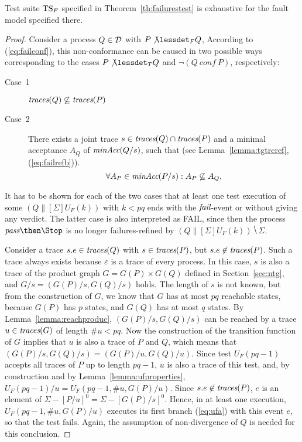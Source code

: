 %
\begin{lemma}\label{lemma:mainfexhaustive}
Test suite ${\text{TS}}_F$ specified in Theorem~\ref{th:failurestest} is exhaustive
for the fault model specified there.
\end{lemma}
\begin{proof}
Consider a process $Q\in{\cal D}$ with $P\not\lessdet_F Q$, According to
(\ref{eq:failconf}), this non-conformance can be caused in two possible ways
corresponding to the cases $P\not\lessdet_T Q$ and $\neg(Q\ conf\ P)$,
respectively:
\begin{description}
\item[Case~1] $\text{\it traces}(Q)\not\subseteq \text{\it traces}(P)$
\item[Case~2] There exists a joint trace $s\in\text{\it traces}(Q)\cap\text{\it traces}(P)$ and a minimal acceptance $A_Q$
of $\text{\it minAcc}(Q/s)$, such that
(see Lemma~\ref{lemma:tgtrcref}, (\ref{eq:failrefb})).
\begin{equation}
\label{eq:accsnotcontained}
\forall A_P\in\text{\it minAcc}(P/s): A_P\not\subseteq A_Q,
\end{equation}
\end{description}
It has to be shown for each of the two cases that at least one test
execution of some $(Q\parallel[\Sigma] U_F(k))$ with $k < pq$ ends with the
   ${\text{\it fail}}$-event or without giving any verdict. The latter case is also
interpreted  as FAIL, since then the process $\epass\then\Stop$ is no longer
failures-refined by $(Q\parallel[\Sigma] U_F(k))\hide \Sigma$.

\medskip
{} Consider a  trace $s.e\in\text{\it traces}(Q)$ with $s\in\text{\it traces}(P)$,
but $s.e\not\in\text{\it traces}(P)$. Such a trace always exists because $\varepsilon$ is
a trace of every process. In this case, $s$ is also a trace of the product
graph $G = G(P)\times G(Q)$ defined in Section~\ref{sec:ntg}, and $G/s =
(G(P)/s,G(Q)/s)$ holds. The length of $s$ is not known, but from the
construction of $G$,  we know that $G$ has at most $pq$ reachable states,
because $G(P)$ has $p$ states, and $G(Q)$ has at most $q$ states. By
Lemma~\ref{lemma:reachproduc}, $(G(P)/s,G(Q)/s)$ can be reached by a trace
$u\in\text{\it traces}(G)$ of length $\#u < pq$. Now the construction of the transition
function of $G$ implies that $u$ is also a trace of $P$ and $Q$, which means
that $(G(P)/s,G(Q)/s) = (G(P)/u,G(Q)/u)$. Since test $U_F(pq-1)$ accepts all
traces of $P$ up to length $pq-1$, $u$ is also a trace of this test, and, by
construction and by Lemma~\ref{lemma:ufproperties}, $U_F(pq-1)/u =
U_F(pq-1,\#u,G(P)/u)$. Since $s.e\not\in\text{\it traces}(P)$, $e$ is an element of
$\Sigma-[P/u]^0 = \Sigma - [G(P)/s]^0$. Hence, in at least one execution,
$U_F(pq-1,\#u,G(P)/u)$ executes its first branch (\ref{eq:ufa}) with this
event $e$, so that the test fails. Again, the assumption of non-divergence of
$Q$ is needed for this conclusion.


\end{proof}
